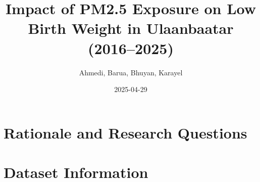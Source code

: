 \documentclass[
]{article}
\title{Impact of PM2.5 Exposure on Low Birth Weight in Ulaanbaatar
(2016--2025)}
\author{Ahmedi, Barua, Bhuyan, Karayel}
\date{2025-04-29}
\newenvironment{Shaded}{\begin{snugshade}}{\end{snugshade}}
\newcommand{\AttributeTok}[1]{\textcolor[rgb]{0.13,0.29,0.53}{#1}}
\newcommand{\FunctionTok}[1]{\textcolor[rgb]{0.13,0.29,0.53}{\textbf{#1}}}
\newcommand{\NormalTok}[1]{#1}
\newcommand{\SpecialCharTok}[1]{\textcolor[rgb]{0.81,0.36,0.00}{\textbf{#1}}}
\begin{document}
\maketitle

{
\setcounter{tocdepth}{2}
\tableofcontents
}
\begin{Shaded}
\end{Shaded}

\newpage
\listoftables
\newpage
\listoffigures
\newpage

\section{Rationale and Research
Questions}\label{rationale-and-research-questions}

\newpage

\section{Dataset Information}\label{dataset-information}
\end{document}
